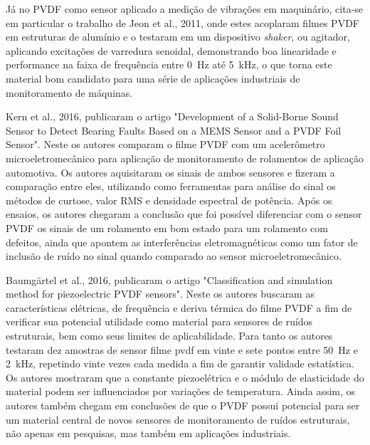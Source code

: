 \documentclass[
	12pt,				
	oneside,			
	a4paper,			
	english,			
	brazil,			
	]{abntex2ppgsi}
\begin{document}
Já no PVDF como sensor aplicado a medição de vibrações em maquinário, cita-se em particular o trabalho de Jeon et al., 2011, onde estes acoplaram filmes PVDF em estruturas de alumínio e o testaram em um dispositivo \textit{shaker}, ou agitador, aplicando excitações de varredura senoidal, demonstrando boa linearidade e performance na faixa de frequência entre \SI{0}{\hertz} até \SI{5}{\kilo\hertz}, o que torna este material bom candidato para uma série de aplicações industriais de monitoramento de máquinas.

Kern et al., 2016, publicaram o artigo "Development of a Solid-Borne Sound Sensor
to Detect Bearing Faults Based on a MEMS Sensor and a PVDF Foil Sensor". Neste os autores comparam o filme PVDF com um acelerômetro microeletromecânico para aplicação de monitoramento de rolamentos de aplicação automotiva. Os autores aquisitaram os sinais de ambos sensores e fizeram a comparação entre eles, utilizando como ferramentas para análise do sinal os métodos de curtose, valor RMS e densidade espectral de potência. Após os ensaios, os autores chegaram a conclusão que foi possível diferenciar com o sensor PVDF os sinais de um rolamento em bom estado para um rolamento com defeitos, ainda que apontem as interferências eletromagnéticas como um fator de inclusão de ruído no sinal quando comparado ao sensor microeletromecânico.

Baumgärtel et al., 2016, publicaram o artigo "Classification and simulation method for piezoelectric PVDF sensors". Neste os autores buscaram as características elétricas, de frequência e deriva térmica do filme PVDF a fim de verificar sua potencial utilidade como material para sensores de ruídos estruturais, bem como seus limites de aplicabilidade. Para tanto os autores testaram dez amostras de sensor filme pvdf em vinte e sete pontos entre \SI{50}{\hertz} e \SI{2}{\kilo\hertz}, repetindo vinte vezes cada medida a fim de garantir validade estatística. Os autores mostraram que a constante piezoelétrica e o módulo de elasticidade do material podem ser influenciados por variações de temperatura. Ainda assim, os autores também chegam em conclusões de que o PVDF possui potencial para ser um material central de novos sensores de monitoramento de ruídos estruturais, não apenas em pesquisas, mas também em aplicações industriais.


\end{document}
